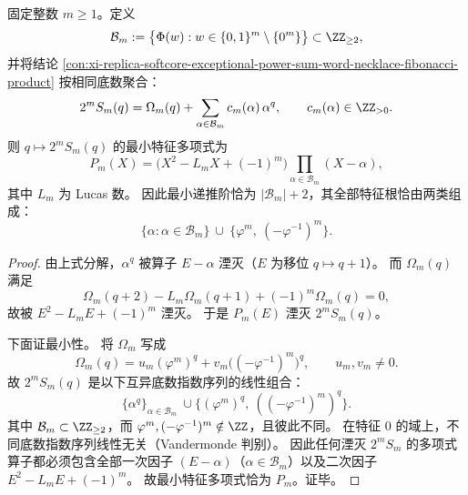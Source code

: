 \begin{conclusion}\label{con:xi-replica-softcore-fixed-m-q-minimal-recurrence}
固定整数 \(m\ge 1\)。定义
\[
\mathcal B_m:=\bigl\{\Phi(w):w\in\{0,1\}^m\setminus\{0^m\}\bigr\}\subset\ZZ_{\ge 2},
\]
并将结论 \ref{con:xi-replica-softcore-exceptional-power-sum-word-necklace-fibonacci-product} 按相同底数聚合：
\[
2^mS_m(q)=\Omega_m(q)+\sum_{\alpha\in\mathcal B_m}c_m(\alpha)\,\alpha^q,
\qquad c_m(\alpha)\in\ZZ_{>0}.
\]
则 \(q\mapsto 2^mS_m(q)\) 的最小特征多项式为
\[
\boxed{
P_m(X)=\bigl(X^2-L_mX+(-1)^m\bigr)\prod_{\alpha\in\mathcal B_m}(X-\alpha),
}
\]
其中 \(L_m\) 为 Lucas 数。
因此最小递推阶恰为 \(|\mathcal B_m|+2\)，其全部特征根恰由两类组成：
\[
\{\alpha:\alpha\in\mathcal B_m\}\ \cup\ \{\varphi^m,\ (-\varphi^{-1})^m\}.
\]
\end{conclusion}
\begin{proof}
由上式分解，\(\alpha^q\) 被算子 \(E-\alpha\) 湮灭（\(E\) 为移位 \(q\mapsto q+1\)）。
而 \(\Omega_m(q)\) 满足
\[
\Omega_m(q+2)-L_m\Omega_m(q+1)+(-1)^m\Omega_m(q)=0,
\]
故被 \(E^2-L_mE+(-1)^m\) 湮灭。
于是 \(P_m(E)\) 湮灭 \(2^mS_m(q)\)。

下面证最小性。
将 \(\Omega_m\) 写成
\[
\Omega_m(q)=u_m(\varphi^m)^q+v_m\bigl((-\varphi^{-1})^m\bigr)^q,
\qquad
u_m,v_m\neq 0.
\]
故 \(2^mS_m(q)\) 是以下互异底数指数序列的线性组合：
\[
\{\alpha^q\}_{\alpha\in\mathcal B_m}\ \cup
\{(\varphi^m)^q,\ ((-\varphi^{-1})^m)^q\}.
\]
其中 \(\mathcal B_m\subset\ZZ_{\ge 2}\)，而 \(\varphi^m,(-\varphi^{-1})^m\notin\ZZ\)，且彼此不同。
在特征 \(0\) 的域上，不同底数指数序列线性无关（Vandermonde 判别）。
因此任何湮灭 \(2^mS_m\) 的多项式算子都必须包含全部一次因子
\((E-\alpha)\)（\(\alpha\in\mathcal B_m\)）以及二次因子
\(E^2-L_mE+(-1)^m\)。
故最小特征多项式恰为 \(P_m\)。证毕。
\end{proof}

\endinput
